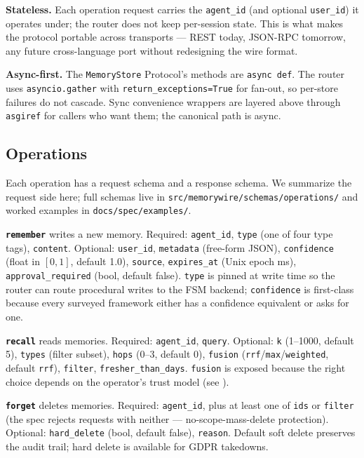 \documentclass[11pt,letterpaper,twocolumn]{article}
\begin{document}
\textbf{Stateless.} Each operation request carries the \texttt{agent\_id} (and optional \texttt{user\_id}) it operates under; the router does not keep per-session state. This is what makes the protocol portable across transports --- REST today, JSON-RPC tomorrow, any future cross-language port without redesigning the wire format.

\textbf{Async-first.} The \texttt{MemoryStore} Protocol's methods are \texttt{async def}. The router uses \texttt{asyncio.gather} with \texttt{return\_exceptions=True} for fan-out, so per-store failures do not cascade. Sync convenience wrappers are layered above through \texttt{asgiref} for callers who want them; the canonical path is async.

\subsection{Operations}
\label{sec:spec-ops}

Each operation has a request schema and a response schema. We summarize the request side here; full schemas live in \texttt{src/memorywire/schemas/operations/} and worked examples in \texttt{docs/spec/examples/}.

\textbf{\texttt{remember}} writes a new memory. Required: \texttt{agent\_id}, \texttt{type} (one of four type tags), \texttt{content}. Optional: \texttt{user\_id}, \texttt{metadata} (free-form JSON), \texttt{confidence} (float in $[0,1]$, default 1.0), \texttt{source}, \texttt{expires\_at} (Unix epoch ms), \texttt{approval\_required} (bool, default false). \texttt{type} is pinned at write time so the router can route procedural writes to the FSM backend; \texttt{confidence} is first-class because every surveyed framework either has a confidence equivalent or asks for one.

\textbf{\texttt{recall}} reads memories. Required: \texttt{agent\_id}, \texttt{query}. Optional: \texttt{k} (1--1000, default 5), \texttt{types} (filter subset), \texttt{hops} (0--3, default 0), \texttt{fusion} (\texttt{rrf}/\texttt{max}/\texttt{weighted}, default \texttt{rrf}), \texttt{filter}, \texttt{fresher\_than\_days}. \texttt{fusion} is exposed because the right choice depends on the operator's trust model (see ).

\textbf{\texttt{forget}} deletes memories. Required: \texttt{agent\_id}, plus at least one of \texttt{ids} or \texttt{filter} (the spec rejects requests with neither --- no-scope-mass-delete protection). Optional: \texttt{hard\_delete} (bool, default false), \texttt{reason}. Default soft delete preserves the audit trail; hard delete is available for GDPR takedowns.
\end{document}
